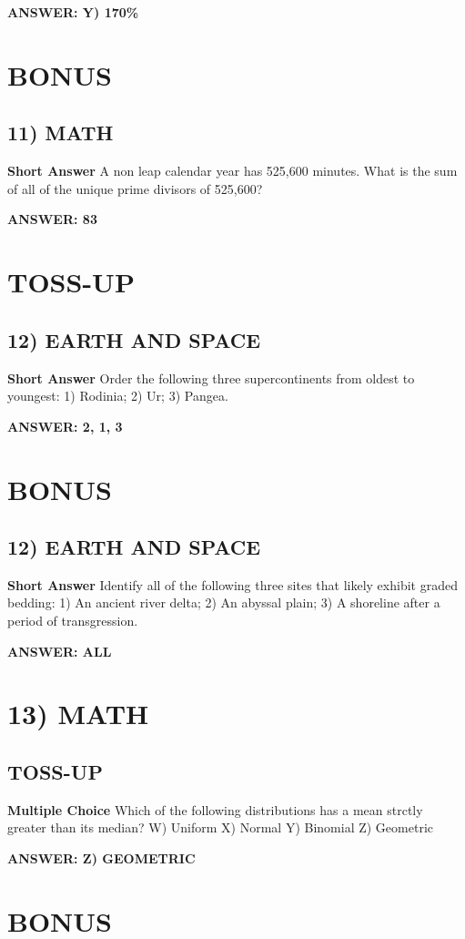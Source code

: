 \documentclass{article}
\begin{document}
\textbf{ANSWER: Y) 170\%}

\section*{BONUS}
\subsection*{11) MATH}
\textbf{Short Answer} A non leap calendar year has 525,600 minutes.
What is the sum of all of the unique prime divisors of 525,600?

\textbf{ANSWER: 83}

\section*{TOSS-UP}
\subsection*{12) EARTH AND SPACE}
\textbf{Short Answer} Order the following three supercontinents from oldest to youngest: 1) Rodinia; 2) Ur; 3) Pangea.

\textbf{ANSWER: 2, 1, 3}

\section*{BONUS}
\subsection*{12) EARTH AND SPACE}
\textbf{Short Answer} Identify all of the following three sites that likely exhibit graded bedding: 1) An ancient river delta; 2) An abyssal plain; 3) A shoreline after a period of transgression.

\textbf{ANSWER: ALL}

\section*{13) MATH}
\subsection*{TOSS-UP}
\textbf{Multiple Choice} Which of the following distributions has a mean strctly greater than its median?
W) Uniform
X) Normal
Y) Binomial
Z) Geometric

\textbf{ANSWER: Z) GEOMETRIC}

\section*{BONUS}
\end{document}
